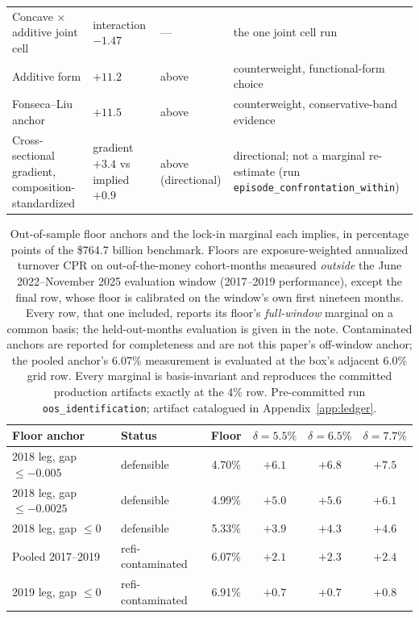\documentclass[12pt]{article}
\begin{document}
\begin{table}[H]
\begin{tabular}{@{}>{\raggedright\arraybackslash}p{3.5cm}>{\raggedright\arraybackslash}p{2.1cm}>{\raggedright\arraybackslash}p{1.9cm}>{\raggedright\arraybackslash}p{6.0cm}@{}}
Concave $\times$ additive joint cell & interaction $-1.47$ & --- & the one joint cell run \\
Additive form & $+11.2$ & above & counterweight, functional-form choice \\
Fonseca--Liu anchor & $+11.5$ & above & counterweight, conservative-band evidence \\
Cross-sectional gradient, composition-standardized & gradient $+3.4$ vs implied $+0.9$ & above (directional) & directional; not a marginal re-estimate (run \texttt{episode\_confrontation\_within}) \\
\bottomrule
\end{tabular}
\end{table}

\begin{table}[!t]
\centering
\footnotesize
\begin{threeparttable}
\caption{Out-of-sample floor anchors and the lock-in marginal each implies, in percentage points of the \$764.7 billion benchmark. Floors are exposure-weighted annualized turnover CPR on out-of-the-money cohort-months measured \emph{outside} the June 2022--November 2025 evaluation window (2017--2019 performance), except the final row, whose floor is calibrated on the window's own first nineteen months. Every row, that one included, reports its floor's \emph{full-window} marginal on a common basis; the held-out-months evaluation is given in the note. Contaminated anchors are reported for completeness and are not this paper's off-window anchor; the pooled anchor's 6.07\% measurement is evaluated at the box's adjacent 6.0\% grid row. Every marginal is basis-invariant and reproduces the committed production artifacts exactly at the 4\% row. Pre-committed run \texttt{oos\_identification}; artifact catalogued in Appendix~\ref{app:ledger}.}
\label{tab:oosfloor}
\begin{tabular}{llcccc}
\toprule
Floor anchor & Status & Floor & $\delta = 5.5\%$ & $\delta = 6.5\%$ & $\delta = 7.7\%$ \\
\midrule
2018 leg, gap $\leq -0.005$ & defensible & 4.70\% & $+6.1$ & $+6.8$ & $+7.5$ \\
2018 leg, gap $\leq -0.0025$ & defensible & 4.99\% & $+5.0$ & $+5.6$ & $+6.1$ \\
2018 leg, gap $\leq 0$ & defensible & 5.33\% & $+3.9$ & $+4.3$ & $+4.6$ \\
\midrule
Pooled 2017--2019 & refi-contaminated & 6.07\% & $+2.1$ & $+2.3$ & $+2.4$ \\
2019 leg, gap $\leq 0$ & refi-contaminated & 6.91\% & $+0.7$ & $+0.7$ & $+0.8$ \\

\end{tabular}
\end{threeparttable}
\end{table}
\end{document}
